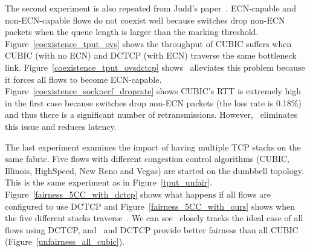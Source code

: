 The second experiment is also repeated from Judd's paper~\cite{judd2015nsdi}. 
ECN-capable and non-ECN-capable flows do not coexist well because switches
drop non-ECN packets when the queue length is larger than the marking threshold. Figure~\ref{coexistence_tput_ovs}
shows the throughput of CUBIC suffers when CUBIC (with no ECN) and DCTCP (with ECN) traverse the same bottleneck link.
Figure~\ref{coexistence_tput_ovsdctcp} shows~\acdc{} alleviates this problem 
because it forces all flows to become ECN-capable.
Figure~\ref{coexistence_sockperf_droprate} shows CUBIC's RTT is extremely high
in the first case because switches drop non-ECN packets (the loss rate is 0.18\%) and thus
there is a significant number of retransmissions. However,~\acdc{} eliminates 
this issue and reduces latency.

The last experiment examines the impact of having multiple TCP stacks on the same fabric. 
Five flows with different congestion control algorithms (CUBIC, Illinois, HighSpeed, New Reno and Vegas) are started
on the dumbbell topology. This is the same experiment as in Figure~\ref{tput_unfair}.
Figure~\ref{fairness_5CC_with_dctcp} shows what happens if all
flows are configured to use DCTCP and Figure~\ref{fairness_5CC_with_ours} shows when
the five different stacks traverse~\acdc{}. We can see~\acdc{} closely tracks the ideal case of
all flows using DCTCP, and~\acdc{} and DCTCP provide better fairness than all CUBIC (Figure~\ref{unfairness_all_cubic}).

